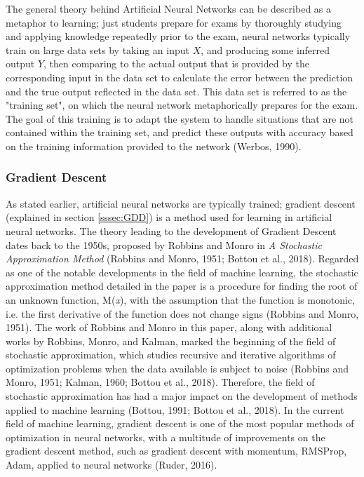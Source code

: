 \documentclass[11pt,titlepage]{article}
\begin{document}
The general theory behind Artificial Neural Networks can be described as a metaphor to learning; just students prepare for exams by thoroughly studying and applying knowledge repeatedly prior to the exam, neural networks typically train on large data sets by taking an input $X$, and producing some inferred output $Y$, then comparing to the actual output that is provided by the corresponding input in the data set to calculate the error between the prediction and the true output reflected in the data set. This data set is referred to as the "training set", on which the neural network  metaphorically prepares for the exam. The goal of this training is to adapt the system to handle situations that are not contained within the training set, and predict these outputs with accuracy based on the training information provided to the network (Werbos, 1990).\par

\subsubsection{Gradient Descent}
As stated earlier, artificial neural networks are typically trained; gradient descent (explained in section \ref{sssec:GDD}) is a method used for learning in artificial neural networks. The theory leading to the development of Gradient Descent dates back to the 1950s, proposed by Robbins and Monro in \textit{A Stochastic Approximation Method} (Robbins and Monro, 1951; Bottou et al., 2018). Regarded as one of the notable developments in the field of machine learning, the stochastic approximation method detailed in the paper is a procedure for finding the root of an unknown function, M(\textit{x}), with the assumption that the function is monotonic, i.e. the first derivative of the function does not change signs (Robbins and Monro, 1951). The work of Robbins and Monro in this paper, along with additional works by Robbins, Monro, and Kalman, marked the beginning of the field of stochastic approximation, which studies recursive and iterative algorithms of optimization problems when the data available is subject to noise (Robbins and Monro, 1951; Kalman, 1960; Bottou et al., 2018). Therefore, the field of stochastic approximation has had a major impact on the development of methods applied to machine learning (Bottou, 1991; Bottou et al., 2018). In the current field of machine learning, gradient descent is one of the most popular methods of optimization in neural networks, with a multitude of improvements on the gradient descent method, such as gradient descent with momentum, RMSProp, Adam, applied to neural networks (Ruder, 2016).\par
\end{document}
